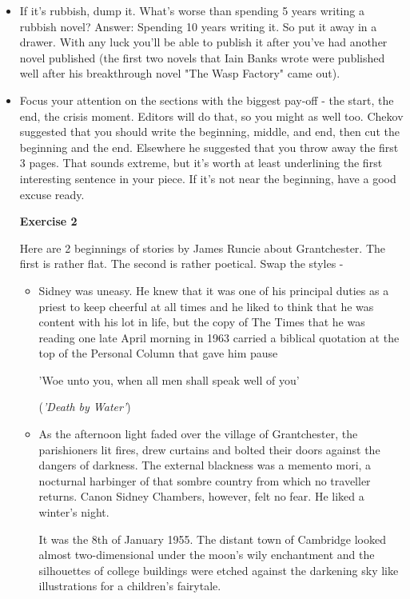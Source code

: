 \documentclass[11pt]{article}
\begin{document}
\begin{itemize}
\item If it's rubbish, dump it. What's worse than spending 5 years writing a rubbish novel? Answer: Spending 10 years writing it. So put it away in a drawer. With any luck you'll be able to publish it after you've had another novel published (the first two novels that Iain Banks wrote were published well after his breakthrough novel "The Wasp Factory" came out).

\item Focus your attention on the sections with the biggest pay-off - the start, the end, the crisis moment. Editors will do that, so you might as well too. Chekov suggested that you should write the beginning, middle, and end, then cut the beginning and the end. Elsewhere he suggested that you throw away the first 3 pages. That sounds extreme, but it's worth at least underlining the first interesting sentence in your piece. If it's not near the beginning, have a good excuse ready. 

\textbf{Exercise 2}

Here are 2 beginnings of stories by James Runcie about Grantchester. The first is rather flat. The second is rather poetical. Swap the styles -
\begin{itemize}
\item    Sidney was uneasy. He knew that it was one of his principal duties as a priest to keep cheerful at all times and he liked to think that he was content with his lot in life, but the copy of The Times that he was reading one late April morning in 1963 carried a biblical quotation at the top of the Personal Column that gave him pause

    'Woe unto you, when all men shall speak well of you'

    (\textit{'Death by Water'})

\item As the afternoon light faded over the village of Grantchester, the parishioners lit fires, drew curtains and bolted their doors against the dangers of darkness. The external blackness was a memento mori, a nocturnal harbinger of that sombre country from which no traveller returns. Canon Sidney Chambers, however, felt no fear. He liked a winter's night.

    It was the 8th of January 1955. The distant town of Cambridge looked almost two-dimensional under the moon's wily enchantment and the silhouettes of college buildings were etched against the darkening sky like illustrations for a children's fairytale.


\end{itemize}
\end{itemize}
\end{document}
